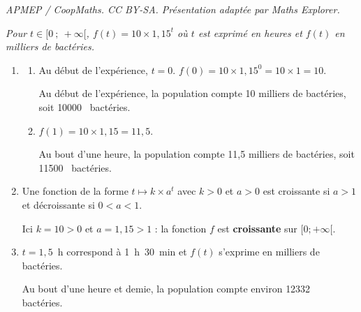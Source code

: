 \documentclass[10pt]{article}
\providecommand{\np}[2][]{{#2~#1}}
\begin{document}
\noindent\textit{APMEP / CoopMaths. CC BY-SA. Présentation adaptée par Maths Explorer.}\par\medskip
\emph{Pour $t \in [0~;~+\infty[$, $f(t) = 10 \times 1,15^{t}$ où $t$ est exprimé en heures et
$f(t)$ en milliers de bactéries.}

\begin{enumerate}
	\item
	\begin{enumerate}
		\item Au début de l'expérience, $t=0$.
		$f(0) = 10 \times 1,15^{0} = 10 \times 1 = 10$.

		Au début de l'expérience, la population compte 10 milliers de bactéries, soit
		\np{10000} bactéries.

		\item $f(1) = 10 \times 1,15 = 11,5$.

		Au bout d'une heure, la population compte 11,5 milliers de bactéries, soit
		\np{11500} bactéries.
	\end{enumerate}

	\item Une fonction de la forme $t \longmapsto k \times a^t$ avec $k > 0$ et $a > 0$ est croissante
	si $a > 1$ et décroissante si $0 < a < 1$.

	Ici $k = 10 > 0$ et $a = 1,15 > 1$ : la fonction $f$ est \textbf{croissante} sur $[0 ; +\infty[$.

	\item $t = 1,5$~h correspond à 1~h~30~min et $f(t)$ s'exprime en milliers de bactéries.

	Au bout d'une heure et demie, la population compte environ \np{12332} bactéries.
\end{enumerate}
\end{document}
